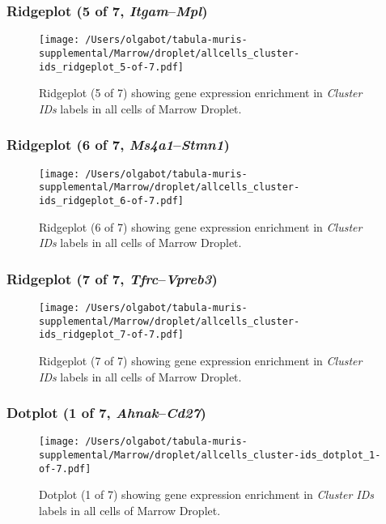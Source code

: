 \clearpage

\subsubsection{Ridgeplot (5 of 7, \emph{Itgam}--\emph{Mpl})}
\begin{figure}[h]
\centering
\texttt{[image: /Users/olgabot/tabula-muris-supplemental/Marrow/droplet/allcells\_cluster-ids\_ridgeplot\_5-of-7.pdf]}

\caption{ Ridgeplot (5 of 7)  showing gene expression enrichment in \emph{Cluster IDs} labels in all cells of Marrow Droplet. }
\end{figure}


\clearpage

\subsubsection{Ridgeplot (6 of 7, \emph{Ms4a1}--\emph{Stmn1})}
\begin{figure}[h]
\centering
\texttt{[image: /Users/olgabot/tabula-muris-supplemental/Marrow/droplet/allcells\_cluster-ids\_ridgeplot\_6-of-7.pdf]}

\caption{ Ridgeplot (6 of 7)  showing gene expression enrichment in \emph{Cluster IDs} labels in all cells of Marrow Droplet. }
\end{figure}


\clearpage

\subsubsection{Ridgeplot (7 of 7, \emph{Tfrc}--\emph{Vpreb3})}
\begin{figure}[h]
\centering
\texttt{[image: /Users/olgabot/tabula-muris-supplemental/Marrow/droplet/allcells\_cluster-ids\_ridgeplot\_7-of-7.pdf]}

\caption{ Ridgeplot (7 of 7)  showing gene expression enrichment in \emph{Cluster IDs} labels in all cells of Marrow Droplet. }
\end{figure}


\clearpage

\subsubsection{Dotplot (1 of 7, \emph{Ahnak}--\emph{Cd27})}
\begin{figure}[h]
\centering
\texttt{[image: /Users/olgabot/tabula-muris-supplemental/Marrow/droplet/allcells\_cluster-ids\_dotplot\_1-of-7.pdf]}

\caption{ Dotplot (1 of 7)  showing gene expression enrichment in \emph{Cluster IDs} labels in all cells of Marrow Droplet. }
\end{figure}


